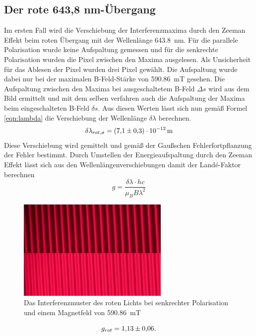 \subsection{Der rote 643,8 nm-Übergang}
Im ersten Fall wird die Verschiebung der Interferenzmaxima durch den Zeeman Effekt beim roten Übergang mit der Wellenlänge \SI{643,8}{\nano\metre}.
Für die parallele Polarisation wurde keine Aufspaltung gemessen und für die senkrechte Polarisation wurden die Pixel zwischen den Maxima ausgelesen.
Als Unsicherheit für das Ablesen der Pixel wurden drei Pixel gewählt.
Die Aufspaltung wurde dabei nur bei der maximalen B-Feld-Stärke von \SI{590,86}{\milli\tesla} gesehen.
Die Aufspaltung zwischen den Maxima bei ausgeschaltetem B-Feld $\Delta s$ wird aus dem Bild ermittelt und mit dem selben verfahren auch die Aufspaltung der Maxima beim eingeschalteten B-Feld $\delta s$.
Aus diesen Werten lässt sich nun gemäß Formel \ref{eqn:lambda} die Verschiebung der Wellenlänge $\delta \lambda$ berechnen.
\begin{equation*}
    \delta \lambda_{rot,\sigma} = \SI{7.1(3)d-12}{\metre}
\end{equation*}
Diese Verschiebung wird gemittelt und gemäß der Gaußschen Fehlerfortpflanzung der Fehler bestimmt.
Durch Umstellen der Energieaufspaltung durch den Zeeman Effekt lässt sich aus den Wellenlängenverschiebungen damit der Landé-Faktor berechnen
\begin{equation*}
    g = \frac{\delta \lambda \cdot h c}{\mu_B B \lambda^2}
\end{equation*}
\begin{figure}
    \center
    \includegraphics[width=0.65\textwidth]{bilder/bearbeitet/rot_senk.jpg}
    \caption{Das Interferenzmuster des roten Lichts bei senkrechter Polarisation und einem Magnetfeld von \SI{590,86}{\milli\tesla}}
    \label{fig:rot_senk}
\end{figure}
\begin{equation*}
    g_{rot} = \num{1.13+-0.06}.
\end{equation*}

